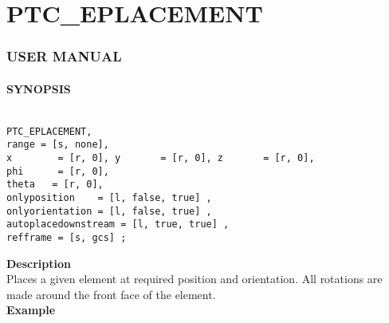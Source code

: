 


\section{PTC\_EPLACEMENT}





\subsubsection{   USER MANUAL   }


\paragraph{SYNOPSIS}
\begin{verbatim}

PTC_EPLACEMENT, 
range = [s, none],
x        = [r, 0], y       = [r, 0], z       = [r, 0],
phi      = [r, 0],
theta   = [r, 0], 
onlyposition    = [l, false, true] ,
onlyorientation = [l, false, true] ,
autoplacedownstream = [l, true, true] ,
refframe = [s, gcs] ; 

\end{verbatim}


\textbf{ Description }\\

 Places a given element at required position and orientation.  All rotations are made around the front face of the element. \\

\textbf{ Example }\\

